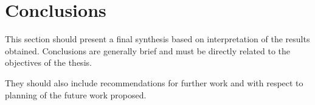 \chapter{Conclusions}

This section should present a final synthesis based on interpretation of the results obtained. Conclusions are generally brief and must be directly related to the objectives of the thesis. 

They should also include recommendations for further work and with respect to planning of the future work proposed.

